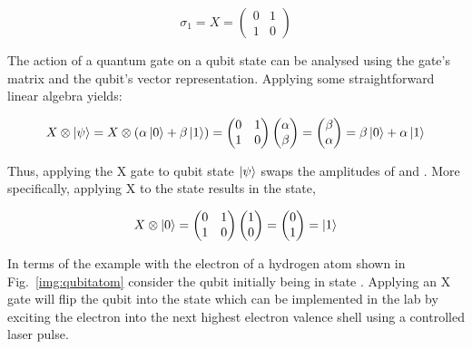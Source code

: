 \begin{equation}
\sigma_{1} = X = \begin{pmatrix}
 0 & 1 \\ 
 1 & 0
 \end{pmatrix}
\end{equation}

The action of a quantum gate on a qubit state can be analysed using the gate's matrix and the qubit's vector representation. Applying some straightforward linear algebra yields:

\begin{equation}
\label{equ:xverification1}
X \otimes \ket{\psi} = X \otimes (\alpha \ket{0} + \beta \ket{1}) = \begin{pmatrix}
 0 & 1 \\ 
 1 & 0
 \end{pmatrix} \begin{pmatrix}
 \alpha  \\ 
 \beta
 \end{pmatrix} = \begin{pmatrix}
 \beta  \\ 
 \alpha
 \end{pmatrix} = \beta \ket{0} + \alpha \ket{1}
\end{equation}

Thus, applying the X gate to qubit state $\ket{\psi}$ swaps the amplitudes of \0 and \1. More specifically, applying X to the \0 state results in the \1 state,

\begin{equation}
\label{equ:xverification2}
X \otimes \ket{0} = \begin{pmatrix}
 0 & 1 \\ 
 1 & 0
 \end{pmatrix} \begin{pmatrix}
 1  \\ 
 0
 \end{pmatrix} = \begin{pmatrix}
 0  \\ 
 1 \end{pmatrix} =  \ket{1}
\end{equation}

In terms of the example with the electron of a hydrogen atom shown in Fig.~\ref{img:qubitatom} consider the qubit initially being in state \0. Applying an X gate will flip the qubit into the \1 state which can be implemented in the lab by exciting the electron into the next highest electron valence shell using a controlled laser pulse.

